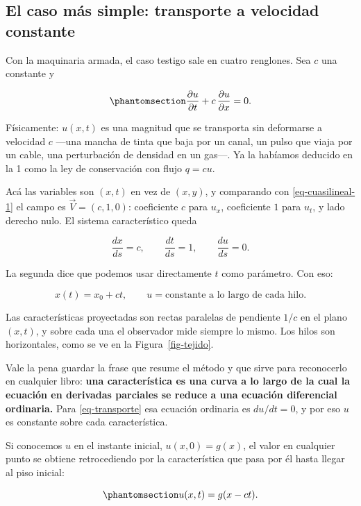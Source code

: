 \documentclass[
  spanish,
  a4paper,
]{scrbook}
\theoremstyle{definition}
\theoremstyle{plain}
\theoremstyle{definition}
\theoremstyle{plain}
\theoremstyle{definition}
\theoremstyle{remark}
\begin{document}
\subsection{El caso más simple: transporte a velocidad
constante}\label{sec-transporte}

Con la maquinaria armada, el caso testigo sale en cuatro renglones. Sea
\(c\) una constante y

\begin{equation}\protect\phantomsection\label{eq-transporte}{
\frac{\partial u}{\partial t} + c\,\frac{\partial u}{\partial x} = 0 .
}\end{equation}

Físicamente: \(u(x,t)\) es una magnitud que se transporta sin deformarse
a velocidad \(c\) ---una mancha de tinta que baja por un canal, un pulso
que viaja por un cable, una perturbación de densidad en un gas---. Ya la
habíamos deducido en la 1 como la ley de conservación con flujo
\(q = cu\).

Acá las variables son \((x,t)\) en vez de \((x,y)\), y comparando con
\ref{eq-cuasilineal-1} el campo es \(\vec V = (c, 1, 0)\): coeficiente
\(c\) para \(u_x\), coeficiente \(1\) para \(u_t\), y lado derecho nulo.
El sistema característico queda

\[
\frac{dx}{ds} = c, \qquad \frac{dt}{ds} = 1, \qquad \frac{du}{ds} = 0 .
\]

La segunda dice que podemos usar directamente \(t\) como parámetro. Con
eso:

\[
x(t) = x_0 + ct, \qquad u = \text{constante a lo largo de cada hilo.}
\]

Las características proyectadas son rectas paralelas de pendiente
\(1/c\) en el plano \((x,t)\), y sobre cada una el observador mide
siempre lo mismo. Los hilos son horizontales, como se ve en la
Figura~\ref{fig-tejido}.

Vale la pena guardar la frase que resume el método y que sirve para
reconocerlo en cualquier libro: \textbf{una característica es una curva
a lo largo de la cual la ecuación en derivadas parciales se reduce a una
ecuación diferencial ordinaria.} Para \ref{eq-transporte} esa ecuación
ordinaria es \(du/dt = 0\), y por eso \(u\) es constante sobre cada
característica.

Si conocemos \(u\) en el instante inicial, \(u(x,0) = g(x)\), el valor
en cualquier punto se obtiene retrocediendo por la característica que
pasa por él hasta llegar al piso inicial:

\begin{equation}\protect\phantomsection\label{eq-sol-transporte}{
u(x,t) = g(x - ct).
}\end{equation}
\end{document}
